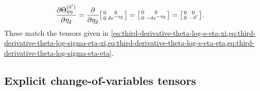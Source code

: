 \documentclass{article}
\begin{document}
\begin{align}
  \frac{\partial \Theta_{\eta\eta}^{(\delta')}}{\partial \eta_2} & = \frac{\partial}{\partial \eta_2} \begin{bsmallmatrix} 0 & 0 \\ 0 & \delta e^{-\eta_2} \end{bsmallmatrix} = \begin{bsmallmatrix} 0 & 0 \\ 0 & -\delta e^{-\eta_2} \end{bsmallmatrix} = \begin{bsmallmatrix} 0 & 0 \\ 0 & -\delta' \end{bsmallmatrix}.
\end{align}
%
These match the tensors given in \cref{eq:third-derivative-theta-log-s-eta-xi,eq:third-derivative-theta-log-sigma-eta-xi,eq:third-derivative-theta-log-s-eta-eta,eq:third-derivative-theta-log-sigma-eta-eta}.

\subsection{Explicit change-of-variables tensors}\label{app:explicit-change-of-vars-derivatives}
\end{document}
